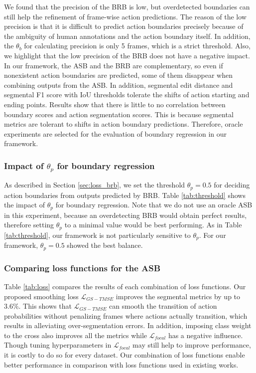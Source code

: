 \documentclass[10pt,twocolumn,letterpaper]{article}
\begin{document}
We found that the precision of the BRB is low, but overdetected boundaries can still help the refinement of frame-wise action predictions. 
The reason of the low precision is that it is difficult to predict action boundaries precisely because of the ambiguity of human annotations and the action boundary itself.
In addition, the $\theta_b$ for calculating precision is only 5 frames, which is a strict threshold.
Also, we highlight that the low precision of the BRB does not have a negative impact.
In our framework, the ASB and the BRB are complementary, so even if nonexistent action boundaries are predicted, some of them disappear when combining outputs from the ASB.
In addition, segmental edit distance and segmental F1 score with IoU thresholds tolerate the shifts of action starting and ending points.
Results show that there is little to no correlation between boundary scores and action segmentation scores.
This is because segmental metrics are tolerant to shifts in action boundary predictions.
Therefore, oracle experiments are selected for the evaluation of boundary regression in our framework.

\vspace{-2pt}
\subsubsection{Impact of $\theta_p$ for boundary regression}
As described in Section \ref{sec:loss_brb}, we set the threshold $\theta_p = 0.5$ for deciding action boundaries from outputs predicted by BRB.
Table \ref{tab:threshold} shows the impact of $\theta_p$ for boundary regression.
Note that we do not use an oracle ASB in this experiment, because an overdetecting BRB would obtain perfect results, therefore setting $\theta_p$ to a minimal value would be best performing.
As in Table \ref{tab:threshold}, our framework is not particularly sensitive to $\theta_p$.
For our framework, $\theta_p = 0.5$ showed the best balance.



\vspace{-2pt}
\subsubsection{Comparing loss functions for the ASB}
\label{sec:combination_loss}
Table \ref{tab:loss} compares the results of each combination of loss functions.
Our proposed smoothing loss $\mathcal{L}_{GS-TMSE}$ improves the segmental metrics by up to 3.6\%.
This shows that $\mathcal{L}_{GS-TMSE}$ can smooth the transition of action probabilities without penalizing frames where actions actually transition, which results in alleviating over-segmentation errors.
In addition, imposing class weight to the cross also improves all the metrics
while $\mathcal{L}_{focal}$ has a negative influence.
Though tuning hyperparameters in $\mathcal{L}_{focal}$ may still help to improve performance,
it is costly to do so for every dataset.
Our combination of loss functions enable better performance in comparison with loss functions used in existing works. 
\end{document}
